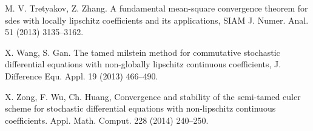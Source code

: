 \documentclass[sort&compress, preprint]{elsarticle}
\theoremstyle{definition}
\theoremstyle{plain}%
\theoremstyle{remark}
\begin{document}
\begin{thebibliography}{26}
M. V. Tretyakov, Z. Zhang.
\newblock A fundamental mean-square convergence theorem for sdes with locally
  lipschitz coefficients and its applications,
\newblock SIAM J. Numer. Anal. 51 (2013) 3135--3162.



X. Wang,  S. Gan.
\newblock The tamed milstein method for commutative stochastic differential
  equations with non-globally lipschitz continuous coefficients,
\newblock J. Difference Equ. Appl. 19 (2013) 466--490.


X. Zong, F. Wu, Ch. Huang,
\newblock Convergence and stability of the semi-tamed euler scheme for
  stochastic differential equations with non-lipschitz continuous coefficients.
\newblock Appl. Math. Comput. 228
  (2014)  240--250.


\end{thebibliography}
\end{document}
